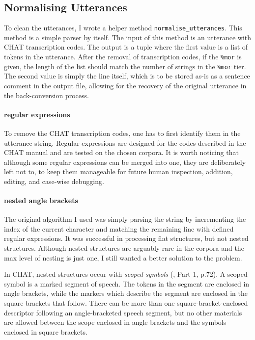 \subsection{Normalising Utterances}\label{sec:normalise}

To clean the utterances, I wrote a helper method \texttt{normalise\_utterances}. This method is a simple parser by itself. The input of this method is an utterance with CHAT transcription codes. The output is a tuple where the first value is a list of tokens in the utterance. After the removal of transcription codes, if the \texttt{\%mor} is given, the length of the list should match the number of strings in the \texttt{\%mor} tier. The second value is simply the line itself, which is to be stored as-is as a sentence comment in the output file, allowing for the recovery of the original utterance in the back-conversion process.


\paragraph{regular expressions}
To remove the CHAT transcription codes, one has to first identify them in the utterance string. Regular expressions are designed for the codes described in the CHAT manual and are tested on the chosen corpora. It is worth noticing that although some regular expressions can be merged into one, they are deliberately left not to, to keep them manageable for future human inspection, addition, editing, and case-wise debugging.

\paragraph{nested angle brackets} The original algorithm I used was simply parsing the string by incrementing the index of the current character and matching the remaining line with defined regular expressions. It was successful in processing flat structures, but not nested structures. Although nested structures are arguably rare in the corpora and the max level of nesting is just one, I still wanted a better solution to the problem.

In CHAT, nested structures occur with \emph{scoped symbols} (\cite{Macwhinney2000}, Part 1, p.72). A scoped symbol is a marked segment of speech. The tokens in the segment are enclosed in angle brackets, while the markers which describe the segment are enclosed in the square brackets that follow. There can be more than one square-bracket-enclosed descriptor following an angle-bracketed speech segment, but no other materials are allowed between the scope enclosed in angle brackets and the symbols enclosed in square brackets.

